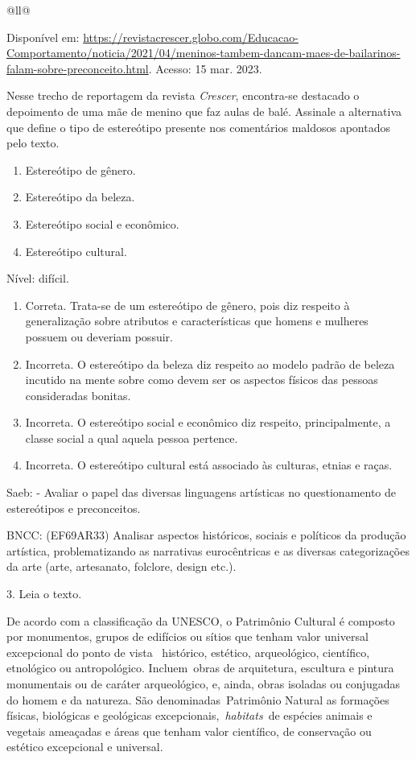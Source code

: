 \begin{itemize}
\begin{itemize}
\begin{escolha}[]{@{}ll@{}}
{{{{{{{{Disponível em:
\url{https://revistacrescer.globo.com/Educacao-Comportamento/noticia/2021/04/meninos-tambem-dancam-maes-de-bailarinos-falam-sobre-preconceito.html}.
Acesso: 15 mar. 2023.

Nesse trecho de reportagem da revista \emph{Crescer}, encontra-se
destacado o depoimento de uma mãe de menino que faz aulas de balé.
Assinale a alternativa que define o tipo de estereótipo presente nos
comentários maldosos apontados pelo texto.

\begin{enumerate}
\def\labelenumi{\alph{enumi})}
\item
  Estereótipo de gênero.
\item
  Estereótipo da beleza.
\item
  Estereótipo social e econômico.
\item
  Estereótipo cultural.
\end{enumerate}

Nível: difícil.

\begin{enumerate}
\def\labelenumi{\alph{enumi}.}
\item
  Correta. Trata-se de um estereótipo de gênero, pois diz respeito à
  generalização sobre atributos e características que homens e mulheres
  possuem ou deveriam possuir.
\item
  Incorreta. O estereótipo da beleza diz respeito ao modelo padrão de
  beleza incutido na mente sobre como devem ser os aspectos físicos das
  pessoas consideradas bonitas.
\item
  Incorreta. O estereótipo social e econômico diz respeito,
  principalmente, a classe social a qual aquela pessoa pertence.
\item
  Incorreta. O estereótipo cultural está associado às culturas, etnias e
  raças.
\end{enumerate}

Saeb: - Avaliar o papel das diversas linguagens artísticas no
questionamento de estereótipos e preconceitos.

BNCC: (EF69AR33) Analisar aspectos históricos, sociais e políticos da
produção artística, problematizando as narrativas eurocêntricas e as
diversas categorizações da arte (arte, artesanato, folclore, design
etc.).

3. Leia o texto.

De acordo com a classificação da UNESCO, o Patrimônio Cultural é
composto por monumentos, grupos de edifícios ou sítios que tenham valor
universal excepcional do ponto de vista ~histórico, estético,
arqueológico, científico, etnológico ou antropológico. Incluem~obras de
arquitetura, escultura e pintura monumentais ou de caráter arqueológico,
e, ainda, obras isoladas ou conjugadas do homem e da natureza. São
denominadas~Patrimônio Natural as formações físicas, biológicas e
geológicas excepcionais,~\emph{habitats}~de espécies animais e vegetais
ameaçadas e áreas que tenham valor científico, de conservação ou
estético excepcional e universal.

}}}}}}}}
\end{escolha}
\end{itemize}
\end{itemize}
